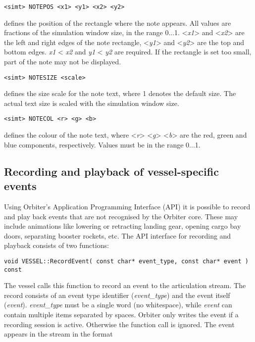 \documentclass[Orbiter Technical Reference.tex]{subfiles}
\begin{document}
\begin{lstlisting}[language=OSFS]
<simt> NOTEPOS <x1> <y1> <x2> <y2>
\end{lstlisting}

\noindent
defines the position of the rectangle where the note appears. All values are fractions of the simulation window size, in the range 0...1. <\textit{x1}> and <\textit{x2}> are the left and right edges of the note rectangle, <\textit{y1}> and <\textit{y2}> are the top and bottom edges. \textit{x1} < \textit{x2} and \textit{y1} < \textit{y2} are required. If the rectangle is set too small, part of the note may not be displayed.

\begin{lstlisting}[language=OSFS]
<simt> NOTESIZE <scale>
\end{lstlisting}

\noindent
defines the size scale for the note text, where 1 denotes the default size. The actual text size is scaled with the simulation window size.

\begin{lstlisting}[language=OSFS]
<simt> NOTECOL <r> <g> <b>
\end{lstlisting}

\noindent
defines the colour of the note text, where <\textit{r}> <\textit{g}> <\textit{b}> are the red, green and blue components, respectively. Values must be in the range 0...1.


\subsection{Recording and playback of vessel-specific events}
Using Orbiter's Application Programming Interface (API) it is possible to record and play back events that are not recognised by the Orbiter core. These may include animations like lowering or retracting landing gear, opening cargo bay doors, separating booster rockets, etc. 
The API interface for recording and playback consists of two functions:

\begin{lstlisting}
void VESSEL::RecordEvent( const char* event_type, const char* event ) const
\end{lstlisting}

\noindent
The vessel calls this function to record an event to the articulation stream. The record consists of an event type identifier (\textit{event\_type}) and the event itself (\textit{event}). \textit{event\_type} must be a single word (no whitespace), while \textit{event} can contain multiple items separated by spaces. Orbiter only writes the event if a recording session is active. Otherwise the function call is ignored. The event appears in the stream in the format
\end{document}
